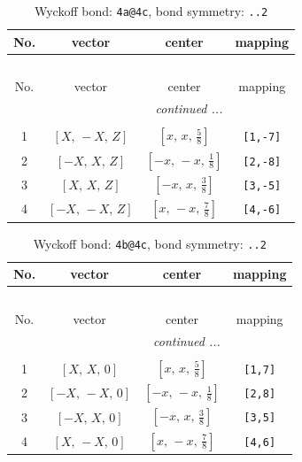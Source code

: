 \documentclass[fleqn,8pt]{jsarticle}
\begin{document}
\begin{longtable}{cccc}
\caption{Wyckoff bond: {\tt 4a@4c}, bond symmetry: {\tt ..2}}
 \\
 \hline \hline
No. & vector & center & mapping \\ \hline \endfirsthead

\multicolumn{3}{l}{\tablename\ \thetable{}} \\
 \hline \hline
No. & vector & center & mapping \\ \hline \endhead

 \hline \hline
\multicolumn{3}{r}{\footnotesize\it continued ...} \\ \endfoot

 \hline \hline
\multicolumn{3}{r}{} \\ \endlastfoot

1 & $\left[ X,\, - X,\, Z \right]$ & $\left[ x,\, x,\, \frac{5}{8} \right]$ & {\tt [1,-7]} \\ \hline
2 & $\left[ - X,\, X,\, Z \right]$ & $\left[ - x,\, - x,\, \frac{1}{8} \right]$ & {\tt [2,-8]} \\ \hline
3 & $\left[ X,\, X,\, Z \right]$ & $\left[ - x,\, x,\, \frac{3}{8} \right]$ & {\tt [3,-5]} \\ \hline
4 & $\left[ - X,\, - X,\, Z \right]$ & $\left[ x,\, - x,\, \frac{7}{8} \right]$ & {\tt [4,-6]} \\
\end{longtable}
\renewcommand{\arraystretch}{1.2}
\begin{longtable}{cccc}
\caption{Wyckoff bond: {\tt 4b@4c}, bond symmetry: {\tt ..2}}
 \\
 \hline \hline
No. & vector & center & mapping \\ \hline \endfirsthead

\multicolumn{3}{l}{\tablename\ \thetable{}} \\
 \hline \hline
No. & vector & center & mapping \\ \hline \endhead

 \hline \hline
\multicolumn{3}{r}{\footnotesize\it continued ...} \\ \endfoot

 \hline \hline
\multicolumn{3}{r}{} \\ \endlastfoot

1 & $\left[ X,\, X,\, 0 \right]$ & $\left[ x,\, x,\, \frac{5}{8} \right]$ & {\tt [1,7]} \\ \hline
2 & $\left[ - X,\, - X,\, 0 \right]$ & $\left[ - x,\, - x,\, \frac{1}{8} \right]$ & {\tt [2,8]} \\ \hline
3 & $\left[ - X,\, X,\, 0 \right]$ & $\left[ - x,\, x,\, \frac{3}{8} \right]$ & {\tt [3,5]} \\ \hline
4 & $\left[ X,\, - X,\, 0 \right]$ & $\left[ x,\, - x,\, \frac{7}{8} \right]$ & {\tt [4,6]} \\
\end{longtable}
\end{document}
